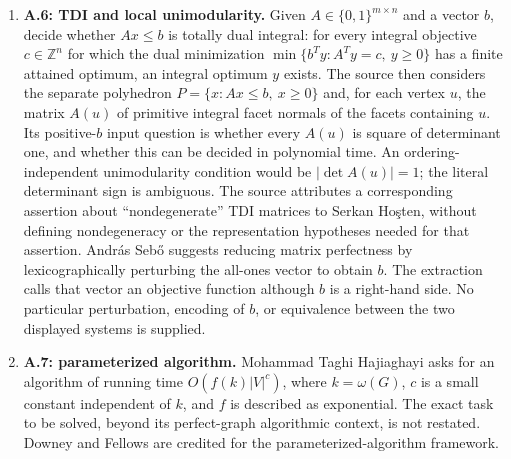 \documentclass[11pt]{article}
\newcommand{\Z}{\mathbb{Z}}
\begin{document}
\begin{enumerate}
The source motivates this with Edmonds' robust Meyniel algorithm: return an odd cycle of length greater than three with at most one chord, or an equal-size clique and coloring. It contrasts the algorithms of Hoang and Hertz, which assume the Meyniel property, and Burlet--Fonlupt decomposition recognition. Its matrix analogy asks, for an arbitrary $0$--$1$ matrix $M$ with maximum row sum $x$, for either an $x$-coloring of columns making all ones in each row differently colored, or an odd-hole submatrix. Here the usual matrix obstruction is a square submatrix of odd order at least three with exactly two ones in every row and column. The source contrasts Cameron--Edmonds' robust method with Conforti--Cornu\'ejols recognition and Conforti--Cornu\'ejols--Rao decomposition, and suggests the analogous relation to Chudnovsky--Robertson--Seymour--Thomas Berge decomposition.
\item \textbf{A.6: TDI and local unimodularity.} Given $A\in\{0,1\}^{m\times n}$ and a vector $b$, decide whether $Ax\leq b$ is totally dual integral: for every integral objective $c\in\Z^n$ for which the dual minimization $\min\{b^Ty:A^Ty=c,\ y\geq0\}$ has a finite attained optimum, an integral optimum $y$ exists. The source then considers the separate polyhedron $P=\{x:Ax\leq b,\ x\geq0\}$ and, for each vertex $u$, the matrix $A(u)$ of primitive integral facet normals of the facets containing $u$. Its positive-$b$ input question is whether every $A(u)$ is square of determinant one, and whether this can be decided in polynomial time. An ordering-independent unimodularity condition would be $|\det A(u)|=1$; the literal determinant sign is ambiguous. The source attributes a corresponding assertion about ``nondegenerate'' TDI matrices to Serkan Ho\c{s}ten, without defining nondegeneracy or the representation hypotheses needed for that assertion. Andr\'as Seb\H{o} suggests reducing matrix perfectness by lexicographically perturbing the all-ones vector to obtain $b$. The extraction calls that vector an objective function although $b$ is a right-hand side. No particular perturbation, encoding of $b$, or equivalence between the two displayed systems is supplied.
\item \textbf{A.7: parameterized algorithm.} Mohammad Taghi Hajiaghayi asks for an algorithm of running time $O(f(k)|V|^c)$, where $k=\omega(G)$, $c$ is a small constant independent of $k$, and $f$ is described as exponential. The exact task to be solved, beyond its perfect-graph algorithmic context, is not restated. Downey and Fellows are credited for the parameterized-algorithm framework.

\end{enumerate}
\end{document}
